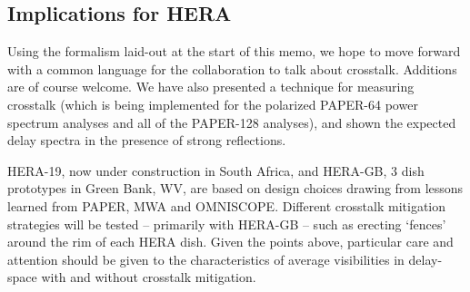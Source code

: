 \documentclass[10pt,a4paper,notitlepage]{article}
\begin{document}
\subsection{Implications for HERA}

Using the formalism laid-out at the start of this memo, we hope to move forward with a common language for the collaboration to talk about crosstalk. Additions are of course welcome. We have also presented a technique for measuring crosstalk (which is being implemented for the polarized PAPER-64 power spectrum analyses and all of the PAPER-128 analyses), and shown the expected delay spectra in the presence of strong reflections. %

HERA-19, now under construction in South Africa, and HERA-GB, 3 dish prototypes in Green Bank, WV, are based on design choices drawing from lessons learned from PAPER, MWA and OMNISCOPE. Different crosstalk mitigation strategies will be tested -- primarily with HERA-GB -- such as erecting `fences' around the rim of each HERA dish.
Given the points above, particular care and attention should be given to the characteristics of average visibilities in delay-space with and without crosstalk mitigation.




\end{document}
